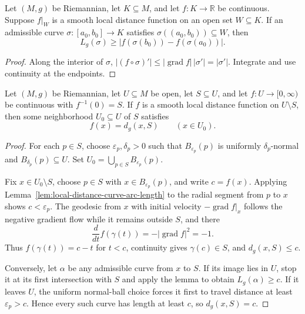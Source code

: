\begin{lemma}
\label{lem:local-distance-curve-arc-length}

Let $(M,g)$ be Riemannian, let $K\subseteq M$, and let $f:K\to\mathbb R$ be
continuous. Suppose $f|_W$ is a smooth local distance function on an open set
$W\subseteq K$. If an admissible curve
$\sigma:[a_0,b_0]\to K$ satisfies
$\sigma((a_0,b_0))\subseteq W$, then
\[
L_g(\sigma)\geq|f(\sigma(b_0))-f(\sigma(a_0))|.
\]
\end{lemma}

\begin{proof}
\sketch Along the interior of $\sigma$,
$|(f\circ\sigma)'|\leq|\operatorname{grad}f|\,|\sigma'|=|\sigma'|$.
Integrate and use continuity at the endpoints.
\end{proof}

\begin{theorem}
\label{thm:smooth-local-distance-function}

Let $(M,g)$ be Riemannian, let $U\subseteq M$ be open, let $S\subseteq U$,
and let $f:U\to[0,\infty)$ be continuous with $f^{-1}(0)=S$. If $f$ is a
smooth local distance function on $U\setminus S$, then some neighborhood
$U_0\subseteq U$ of $S$ satisfies
\[
f(x)=d_g(x,S)
\qquad(x\in U_0).
\]
\end{theorem}

\begin{proof}
\sketch For each $p\in S$, choose $\varepsilon_p,\delta_p>0$ such that
$B_{\varepsilon_p}(p)$ is uniformly $\delta_p$-normal and
$B_{\delta_p}(p)\subseteq U$. Set
$U_0=\bigcup_{p\in S}B_{\varepsilon_p}(p)$.

Fix $x\in U_0\setminus S$, choose $p\in S$ with
$x\in B_{\varepsilon_p}(p)$, and write $c=f(x)$. Applying
Lemma~\ref{lem:local-distance-curve-arc-length} to the radial segment from
$p$ to $x$ shows $c<\varepsilon_p$. The geodesic from $x$ with initial
velocity $-\operatorname{grad}f|_x$ follows the negative gradient flow while
it remains outside $S$, and there
\[
\frac d{dt}f(\gamma(t))=-|\operatorname{grad}f|^2=-1.
\]
Thus $f(\gamma(t))=c-t$ for $t<c$, continuity gives
$\gamma(c)\in S$, and $d_g(x,S)\leq c$.

Conversely, let $\alpha$ be any admissible curve from $x$ to $S$. If its
image lies in $U$, stop it at its first intersection with $S$ and apply the
lemma to obtain $L_g(\alpha)\geq c$. If it leaves $U$, the uniform normal-ball
choice forces it first to travel distance at least $\varepsilon_p>c$. Hence
every such curve has length at least $c$, so $d_g(x,S)=c$.
\end{proof}

